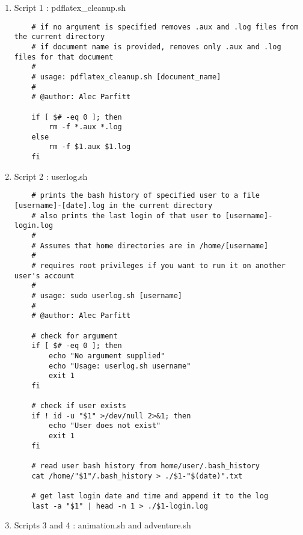 \documentclass[12pt]{article}
\begin{document}
\begin{enumerate}
\item Script 1 : pdflatex_cleanup.sh
\begin{verbatim}
    # if no argument is specified removes .aux and .log files from the current directory
    # if document name is provided, removes only .aux and .log files for that document
    #
    # usage: pdflatex_cleanup.sh [document_name]
    #
    # @author: Alec Parfitt
    
    if [ $# -eq 0 ]; then
        rm -f *.aux *.log
    else
        rm -f $1.aux $1.log
    fi
\end{verbatim}
\item Script 2 : userlog.sh
\begin{verbatim}
    # prints the bash history of specified user to a file [username]-[date].log in the current directory
    # also prints the last login of that user to [username]-login.log
    #
    # Assumes that home directories are in /home/[username]
    #
    # requires root privileges if you want to run it on another user's account
    #
    # usage: sudo userlog.sh [username]
    #
    # @author: Alec Parfitt

    # check for argument
    if [ $# -eq 0 ]; then
        echo "No argument supplied"
        echo "Usage: userlog.sh username"
        exit 1
    fi

    # check if user exists
    if ! id -u "$1" >/dev/null 2>&1; then
        echo "User does not exist"
        exit 1
    fi

    # read user bash history from home/user/.bash_history
    cat /home/"$1"/.bash_history > ./$1-"$(date)".txt

    # get last login date and time and append it to the log
    last -a "$1" | head -n 1 > ./$1-login.log
\end{verbatim}
\item Scripts 3 and 4 : animation.sh and adventure.sh
\end{enumerate}
\end{document}

